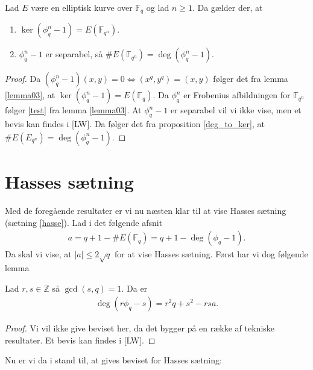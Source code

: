 \begin{proposition}
\label{prop_imp}
Lad $E$ være en elliptisk kurve over $\mathbb{F}_q$ og lad $n \geq 1$. Da gælder der,
at 
\begin{enumerate}
	\item $\ker (\phi_{q}^n - 1) = E(\mathbb{F}_{q^n})$. \label{test}
	\item $\phi_{q}^{n}-1$ er separabel, så $\#E(\mathbb{F}_{q^n})=\deg (\phi_{q}^{n}-1)$. 
\end{enumerate}
\end{proposition}
\begin{proof}
Da $(\phi_{q}^{n} - 1)(x,y) = 0 \Leftrightarrow (x^q, y^q) = (x, y)$ følger det fra
lemma \ref{lemma03}, at $\ker(\phi_{q}^{n}-1)=E(\mathbb{F}_q)$.
Da $\phi_{q}^{n}$ er Frobenius afbildningen for $\mathbb{F}_{q^n}$ følger \eqref{test} fra lemma \ref{lemma03}. At $\phi_{q}^{n} -1$ er separabel vil vi ikke vise, men et bevis kan findes
i [LW]. Da følger det fra proposition \ref{deg_to_ker}, at $\#E(E_{q^n})=\deg(\phi_{q}^{n} -1)$.
\end{proof}

\section{Hasses sætning}
Med de foregående resultater er vi nu næsten klar til at vise Hasses sætning (sætning \ref{hasse}). Lad i det følgende afsnit
\begin{align}
	\label{hasse_as}
	a = q + 1 - \#E(\mathbb{F}_q) = q + 1 - \deg(\phi_q - 1).
\end{align}
Da skal vi vise, at $|a| \leq 2 \sqrt{q}$ for at vise Hasses sætning. Først har vi dog følgende lemma

\begin{lemma}
\label{degree_lemma}
Lad $r, s \in \mathbb{Z}$ så $\gcd(s, q) = 1$. Da er 
\begin{align*}
	\deg(r \phi_q - s) = r^2 q + s^2 - rsa.
\end{align*}
\end{lemma}
\begin{proof}
Vi vil ikke give beviset her, da det bygger på en række af tekniske resultater. Et bevis kan findes i [LW].
\end{proof}

Nu er vi da i stand til, at gives beviset for Hasses sætning:

